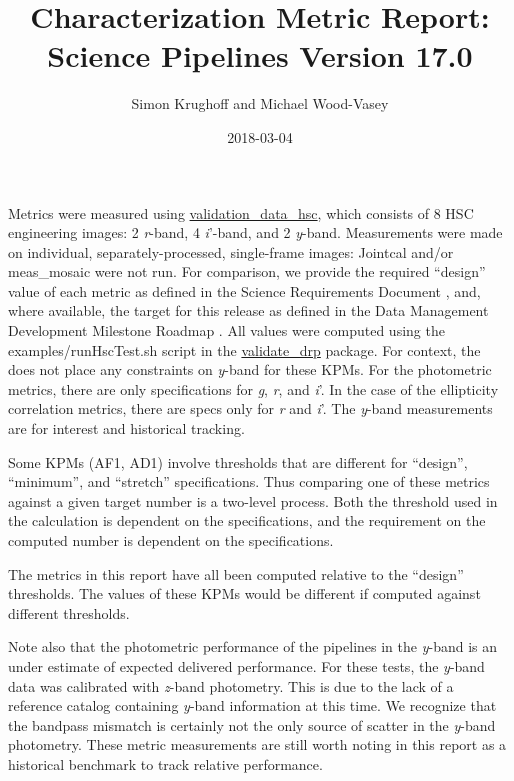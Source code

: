 \documentclass[DM,toc]{lsstdoc}
\title[V17.0 Characterization Report]{Characterization Metric Report: Science Pipelines Version 17.0}
\author{Simon Krughoff and Michael Wood-Vasey}
\date{2018-03-04}
\begin{document}

\maketitle

Metrics were measured using \href{https://github.com/lsst/validation_data_hsc}{validation\_data\_hsc}, which consists of 8 HSC engineering images: 2 \emph{r}-band, 4 \emph{i}'-band, and 2 \emph{y}-band. Measurements were made on individual, separately-processed, single-frame images: Jointcal and/or meas\_mosaic were not run. For comparison, we provide the \SRD required ``design'' value of each metric as defined in the Science Requirements Document , and, where available, the target for this release as defined in the Data Management Development Milestone Roadmap . All values were computed using the examples/runHscTest.sh script in the \href{https://github.com/lsst/validate_drp}{validate\_drp} package. For context, the \SRD does not place any constraints on \emph{y}-band for these KPMs.  For the photometric metrics, there are only specifications for \emph{g}, \emph{r}, and \emph{i}'. In the case of the ellipticity correlation metrics, there are specs only for \emph{r} and \emph{i}'. The \emph{y}-band measurements are for interest and historical tracking.

Some KPMs (AF1, AD1) involve thresholds that are different for ``design'', ``minimum'', and ``stretch'' specifications. Thus comparing one of these metrics against a given target number is a two-level process. Both the threshold used in the calculation is dependent on the specifications, and the requirement on the computed number is dependent on the specifications.

The metrics in this report have all been computed relative to the ``design'' thresholds. The values of these KPMs would be different if computed against different thresholds.

Note also that the photometric performance of the pipelines in the \emph{y}-band is an under estimate of expected delivered performance.  For these tests, the \emph{y}-band data was calibrated with \emph{z}-band photometry.  This is due to the lack of a reference catalog containing \emph{y}-band information at this time. We recognize that the bandpass mismatch is certainly not the only source of scatter in the \emph{y}-band photometry. These metric measurements are still worth noting in this report as a historical benchmark to track relative performance.
\end{document}
